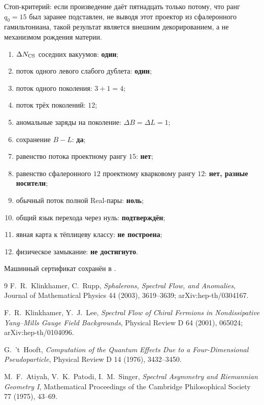 Стоп-критерий: если произведение даёт пятнадцать только потому, что ранг
$q_0=15$ был заранее подставлен, не выводя этот проектор из сфалеронного
гамильтониана, такой результат является внешним декорированием, а не
механизмом рождения материи.

\begin{protocol}
\begin{enumerate}
 \item $\Delta N_{\rm CS}$ соседних вакуумов: \textbf{один};
 \item поток одного левого слабого дублета: \textbf{один};
 \item поток одного поколения: \textbf{$3+1=4$};
 \item поток трёх поколений: \textbf{$12$};
 \item аномальные заряды на поколение: \textbf{$\Delta B=\Delta L=1$};
 \item сохранение $B-L$: \textbf{да};
 \item равенство потока проектному рангу $15$: \textbf{нет};
 \item равенство сфалеронного $12$ проектному кварковому рангу $12$:
 \textbf{нет, разные носители};
 \item обычный поток полной Real-пары: \textbf{ноль};
 \item общий язык перехода через нуль: \textbf{подтверждён};
 \item явная карта к тёплицеву классу: \textbf{не построена};
 \item физическое замыкание: \textbf{не достигнуто}.
\end{enumerate}
\end{protocol}

Машинный сертификат сохранён в
.

\begin{thebibliography}{9}
F.~R.~Klinkhamer, C.~Rupp,
\emph{Sphalerons, Spectral Flow, and Anomalies},
Journal of Mathematical Physics 44 (2003), 3619--3639;
arXiv:hep-th/0304167.

F.~R.~Klinkhamer, Y.~J.~Lee,
\emph{Spectral Flow of Chiral Fermions in Nondissipative Yang--Mills
Gauge Field Backgrounds},
Physical Review D 64 (2001), 065024; arXiv:hep-th/0104096.

G.~'t~Hooft,
\emph{Computation of the Quantum Effects Due to a Four-Dimensional
Pseudoparticle},
Physical Review D 14 (1976), 3432--3450.

M.~F.~Atiyah, V.~K.~Patodi, I.~M.~Singer,
\emph{Spectral Asymmetry and Riemannian Geometry I},
Mathematical Proceedings of the Cambridge Philosophical Society 77
(1975), 43--69.
\end{thebibliography}